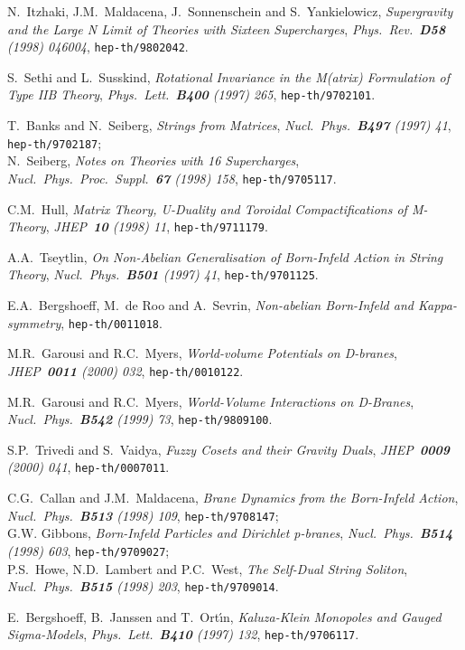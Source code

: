 \documentclass[12pt,a4paper]{article}
\begin{document}
\begin{thebibliography}{99}
N.~Itzhaki, J.M.~Maldacena, J.~Sonnenschein and S.~Yankielowicz,
{\sl Supergravity and the Large N Limit of Theories with Sixteen
Supercharges}, {\it Phys.~Rev.~{\bf D58} (1998) 046004},
{\tt hep-th/9802042}.

S.~Sethi and L.~Susskind, {\sl Rotational Invariance in the M(atrix)
Formulation of Type IIB Theory}, {\it Phys.~Lett.~{\bf B400} (1997)
265}, {\tt hep-th/9702101}.

T.~Banks and N.~Seiberg, {\sl Strings from Matrices},
{\it Nucl.~Phys.~{\bf B497} (1997) 41}, {\tt hep-th/9702187};\\
N.~Seiberg, {\sl Notes on Theories with 16 Supercharges},
{\it Nucl.~Phys.~Proc.~Suppl.~{\bf 67} (1998) 158},
{\tt hep-th/9705117}.

C.M.~Hull, {\sl Matrix Theory, U-Duality and Toroidal Compactifications
of M-Theory}, {\it JHEP~{\bf 10} (1998) 11}, {\tt hep-th/9711179}.

A.A.~Tseytlin, {\sl On Non-Abelian Generalisation of Born-Infeld 
Action in String Theory}, 
{\it Nucl.~Phys.~{\bf B501} (1997) 41},
{\tt hep-th/9701125}.

E.A.~Bergshoeff, M.~de Roo and A.~Sevrin,
{\sl Non-abelian Born-Infeld and Kappa-symmetry},
{\tt hep-th/0011018}.

M.R.~Garousi and R.C.~Myers, {\sl World-volume Potentials on D-branes},
{\it JHEP~{\bf 0011} (2000) 032}, {\tt hep-th/0010122}.

M.R.~Garousi and R.C.~Myers, {\sl World-Volume Interactions on
D-Branes}, {\it Nucl.~Phys.~{\bf B542}
(1999) 73}, {\tt hep-th/9809100}.

S.P.~Trivedi and S.~Vaidya, {\sl Fuzzy Cosets and their Gravity Duals},
{\it JHEP~{\bf 0009} (2000) 041}, {\tt hep-th/0007011}.

C.G.~Callan and J.M.~Maldacena, {\sl Brane Dynamics from the 
Born-Infeld Action}, 
{\it Nucl.~Phys.~{\bf B513} (1998) 109}, {\tt hep-th/9708147};\\
G.W. Gibbons, {\sl Born-Infeld Particles and Dirichlet p-branes},
{\it Nucl.~Phys.~{\bf B514} (1998) 603}, {\tt hep-th/9709027};\\
P.S.~Howe, N.D.~Lambert and P.C.~West, {\sl The Self-Dual String
Soliton},
{\it Nucl.~Phys.~{\bf B515} (1998) 203}, {\tt hep-th/9709014}.

E.~Bergshoeff, B.~Janssen and T.~Ort\'{\i}n, {\sl Kaluza-Klein
Monopoles and Gauged Sigma-Models}, {\it Phys.~Lett.~{\bf B410}
(1997) 132}, {\tt hep-th/9706117}.


\end{thebibliography}
\end{document}
